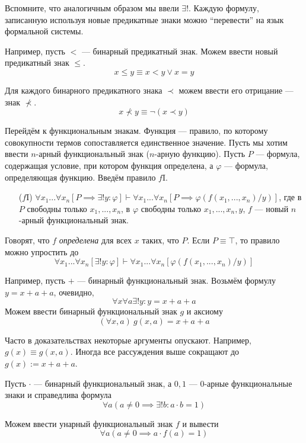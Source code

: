 Вспомните, что аналогичным образом мы ввели $\exists!$. Каждую формулу,
записанную используя новые предикатные знаки можно
``перевести'' на язык формальной системы.

Например, пусть $<$ --- бинарный предикатный знак.
Можем ввести новый предикатный знак $\leq$.
\[
	x\leq y\equiv x<y\lor x=y
\]

Для каждого бинарного предикатного знака $\prec$ можем
ввести его отрицание --- знак $\nprec$.
\[
	x\nprec y\equiv \lnot(x\prec y)
\]

Перейдём к функциональным знакам. Функция --- правило, по которому совокупности
термов сопоставляется единственное значение. Пусть мы хотим ввести $n$-арный
функциональный знак ($n$-арную функцию). Пусть $P$ --- формула, содержащая
условие, при котором функция определена, а $\varphi$ --- формула, определяющая
функцию. Введём правило $f$I.
\begin{enumerate}
	\item[($f$I)]{}${\forall x_1...\forall x_{n}[P\implies \exists !y:\varphi]\vdash
		\forall x_1...\forall x_{n}[P\implies \varphi(f(x_1,...,x_{n})/y)]}$,
	где в $P$ свободны только $x_1,...,x_{n}$, в $\varphi$ свободны только
	$x_1,...,x_{n},y$, $f$ --- новый $n$-арный функциональный знак.
\end{enumerate}

Говорят, что $f$ {\it определена} для всех $x$ таких, что $P$.
Если $P\equiv \top$, то правило можно упростить до
\[
	\forall x_1...\forall x_{n}[\exists !y:\varphi]\vdash
	\forall x_1...\forall x_{n}[\varphi(f(x_1,...,x_{n})/y)]
\]

Например, пусть $+$ --- бинарный функциональный знак. Возьмём формулу $y=x+a+a$, очевидно,
\[
	\forall x\forall a\exists !y:y=x+a+a
\]
Можем ввести бинарный функциональный знак $g$ и аксиому
\[
	(\forall x,a)~g(x,a)=x+a+a
\]

Часто в доказательствах некоторые аргументы опускают.
Например, $g(x)\equiv g(x,a)$.
Иногда все рассуждения выше сокращают до $g(x):=x+a+a$.

Пусть $\cdot$ --- бинарный функциональный знак,
а $0,1$ --- $0$-арные функциональные знаки и справедлива формула
\[
	\forall a(a\neq 0\implies \exists !b:a\cdot b=1)
\]

Можем ввести унарный функциональный знак $f$ и вывести
\[
	\forall a(a\neq 0\implies a\cdot f(a)=1)
\]

\pagebreak
